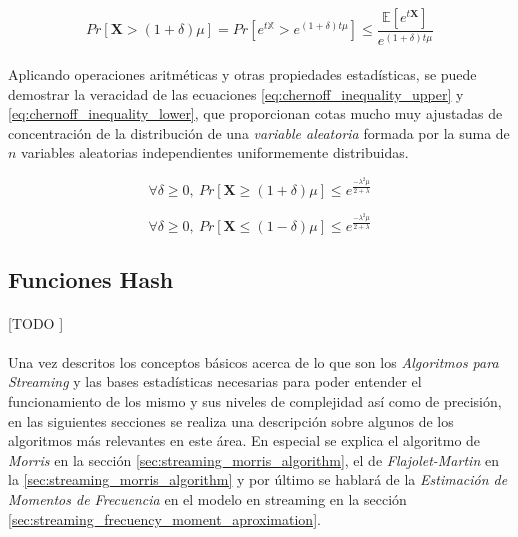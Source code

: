 \documentclass{subfiles}
\begin{document}
        \begin{equation}
        \label{eq:chernoff_inequality_raw}
          Pr[ \boldsymbol{X} > (1+\delta) \mu] =
          Pr[ e^{t \mathbb{X}} > e^{(1+\delta)t\mu}] \leq
          \frac{\mathbb{E}[ e^{t \boldsymbol{X}}] }{e^{(1 + \delta) t \mu}}
        \end{equation}

        \paragraph{}
        Aplicando operaciones aritméticas y otras propiedades estadísticas, se puede demostrar la veracidad de las ecuaciones \eqref{eq:chernoff_inequality_upper} y \eqref{eq:chernoff_inequality_lower}, que proporcionan cotas mucho muy ajustadas de concentración de la distribución de una \emph{variable aleatoria} formada por la suma de $n$ variables aleatorias independientes uniformemente distribuidas.

        \begin{equation}
        \label{eq:chernoff_inequality_upper}
          \forall \delta \geq 0, \ Pr[\boldsymbol{X} \geq (1 + \delta)\mu]  \leq e^\frac{-\lambda^2\mu}{2 + \lambda}
        \end{equation}

        \begin{equation}
        \label{eq:chernoff_inequality_lower}
          \forall \delta \geq 0, \ Pr[\boldsymbol{X} \leq (1 - \delta)\mu]  \leq e^\frac{-\lambda^2\mu}{2 + \lambda}
        \end{equation}

      \subsection{Funciones Hash}
      \label{sec:hash_functions}

        \paragraph{}
        [TODO ]

      \paragraph{}
      Una vez descritos los conceptos básicos acerca de lo que son los \emph{Algoritmos para Streaming} y las bases estadísticas necesarias para poder entender el funcionamiento de los mismo y sus niveles de complejidad así como de precisión, en las siguientes secciones se realiza una descripción sobre algunos de los algoritmos más relevantes en este área. En especial se explica el algoritmo de \emph{Morris} en la sección \ref{sec:streaming_morris_algorithm}, el de \emph{Flajolet-Martin} en la \ref{sec:streaming_morris_algorithm} y por último se hablará de la \emph{Estimación de Momentos de Frecuencia} en el modelo en streaming en la sección \ref{sec:streaming_frecuency_moment_aproximation}.
\end{document}
